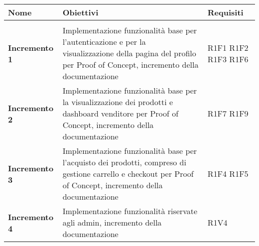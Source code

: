 {


\centering
\renewcommand{\arraystretch}{1.8}
\begin{longtable}{C{3cm} C{8cm} C{3cm} }

\textbf{Nome} &
\textbf{Obiettivi}&
\textbf{Requisiti}\\
\endhead

\\
\textbf{Incremento 1} & Implementazione funzionalità base per l'autenticazione e per la visualizzazione della pagina del profilo per Proof of Concept, incremento della documentazione & R1F1 \newline R1F2 \newline R1F3 \newline R1F6 \\
\textbf{Incremento 2} & Implementazione funzionalità base per la visualizzazione dei prodotti e dashboard venditore per Proof of Concept, incremento della documentazione & R1F7 \newline R1F9 \\
\textbf{Incremento 3} & Implementazione funzionalità base per l'acquisto dei prodotti, compreso di gestione carrello e checkout per Proof of Concept, incremento della documentazione & R1F4 \newline R1F5 \\
\textbf{Incremento 4} & Implementazione funzionalità riservate agli admin, incremento della documentazione & R1V4 \\


\end{longtable}}
